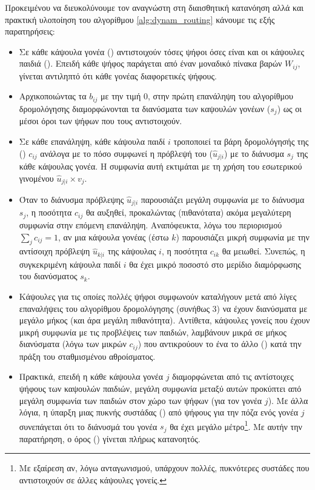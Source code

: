 Προκειμένου να διευκολύνουμε τον αναγνώστη στη διαισθητική κατανόηση αλλά και πρακτική υλοποίηση του αλγορίθμου \ref{alg:dynam_routing} κάνουμε τις εξής παρατηρήσεις:
\begin{itemize}
    \item Σε κάθε κάψουλα γονέα () αντιστοιχούν τόσες ψήφοι όσες είναι και οι κάψουλες παιδιά (). Επειδή κάθε ψήφος παράγεται από έναν μοναδικό πίνακα βαρών $W_{ij}$, γίνεται αντιληπτό ότι κάθε γονέας  διαφορετικές ψήφους.
    \item Αρχικοποιώντας τα $b_{ij}$ με την τιμή $0$, στην πρώτη επανάληψη του αλγορίθμου δρομολόγησης διαμορφώνονται τα διανύσματα των καψουλών γονέων ($s_j$) ως οι μέσοι όροι των ψήφων που τους αντιστοιχούν.
    \item Σε κάθε επανάληψη, κάθε κάψουλα παιδί $i$ τροποποιεί τα βάρη δρομολόγησής της () $c_{ij}$ ανάλογα με το πόσο συμφωνεί η πρόβλεψή του ($\hat{u}_{j|i}$) με το διάνυσμα $s_j$ της κάθε κάψουλας γονέα. Η συμφωνία αυτή εκτιμάται με τη χρήση του εσωτερικού γινομένου $\hat{u}_{j|i} \times v_j$.
    \item Όταν το διάνυσμα πρόβλεψης $\hat{u}_{j|i}$ παρουσιάζει μεγάλη συμφωνία με το διάνυσμα $s_j$, η ποσότητα $c_{ij}$ θα αυξηθεί, προκαλώντας (πιθανότατα) ακόμα μεγαλύτερη συμφωνία στην επόμενη επανάληψη. Αναπόφευκτα, λόγω του περιορισμού $\sum_j c_{ij} = 1$, αν μια κάψουλα γονέας (έστω $k$) παρουσιάζει μικρή συμφωνία με την αντίσοιχη πρόβλεψη $\hat{u}_{k|i}$ της κάψουλας $i$, η ποσότητα $c_{ik}$ θα μειωθεί. Συνεπώς, η συγκεκριμένη κάψουλα παιδί $i$ θα έχει μικρό ποσοστό στο μερίδιο διαμόρφωσης του διανύσματος $s_k$.
    \item Κάψουλες για τις οποίες πολλές ψήφοι συμφωνούν καταλήγουν μετά από λίγες επαναλήψεις του αλγορίθμου δρομολόγησης (συνήθως 3) να έχουν διανύσματα με μεγάλο μήκος (και άρα μεγάλη πιθανότητα). Αντίθετα, κάψουλες γονείς που έχουν μικρή συμφωνία με τις προβλέψεις των παιδιών, λαμβάνουν μικρά σε μήκος διανύσματα (λόγω των μικρών $c_{ij}$) που αντικρούουν το ένα το άλλο () κατά την πράξη του σταθμισμένου αθροίσματος.
    \item Πρακτικά, επειδή η κάθε κάψουλα γονέα $j$ διαμορφώνεται από τις αντίστοιχες ψήφους των καψουλών παιδιών, μεγάλη συμφωνία μεταξύ αυτών προκύπτει από μεγάλη συμφωνία των παιδιών στον χώρο των ψήφων (για τον γονέα $j$). Με άλλα λόγια, η ύπαρξη μιας πυκνής συστάδας () από ψήφους για την πόζα ενός γονέα $j$ συνεπάγεται ότι το διάνυσμά του γονέα $s_j$ θα έχει μεγάλο μέτρο\footnote{Με εξαίρεση αν, λόγω ανταγωνισμού, υπάρχουν πολλές, πυκνότερες συστάδες που αντιστοιχούν σε άλλες κάψουλες γονείς.}. Με αυτήν την παρατήρηση, ο όρος  () γίνεται πλήρως κατανοητός.
\end{itemize}


